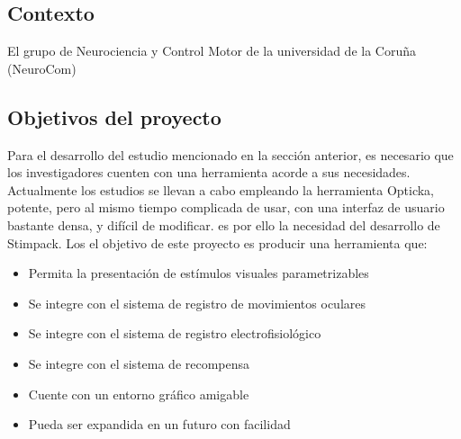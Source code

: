 \documentclass[conference]{IEEEtran}
\begin{document}
\subsection{Contexto}

El grupo de Neurociencia y Control Motor de la universidad de la Coruña (NeuroCom) 
\subsection{Objetivos del proyecto}

Para el desarrollo del estudio mencionado en la sección anterior, es necesario que los investigadores cuenten con una herramienta acorde a sus necesidades. Actualmente los estudios se llevan a cabo empleando la herramienta Opticka, potente, pero al mismo tiempo complicada de usar, con una interfaz de usuario bastante densa, y difícil de modificar.  es por ello la necesidad del desarrollo de Stimpack.
Los el objetivo de este proyecto es producir una herramienta que:

\begin{itemize}
	
	\item Permita la presentación de estímulos visuales parametrizables
	\item Se integre con el sistema de registro de movimientos oculares
	\item Se integre con el sistema de registro electrofisiológico
	\item Se integre con el sistema de recompensa
	\item Cuente con un entorno gráfico amigable
	\item Pueda ser expandida en un futuro con facilidad
\end{itemize}
\end{document}
